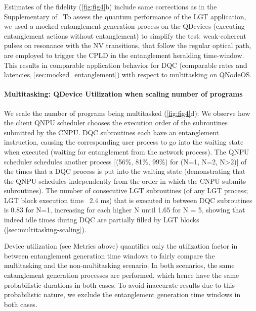 Estimates of the fidelity (\cref{fig:fig4}b) include same corrections as in the Supplementary of~\cite{pompili_2021_multinode} To assess the quantum performance of the LGT application, we used a mocked entanglement generation process on the QDevices (executing entanglement actions without entanglement) to simplify the test: weak-coherent pulses on resonance with the NV transitions, that follow the regular optical path, are employed to trigger the CPLD in the entanglement heralding time-window. This results in comparable application behavior for DQC (comparable rates and latencies, \cref{sec:mocked_entanglement}) with respect to multitasking on QNodeOS.

\paragraph{Multitasking: QDevice Utilization when scaling number of programs}

We scale the number of programs being multitasked (\cref{fig:fig4}d): We observe how the client QNPU scheduler chooses the execution order of the subroutines submitted by the CNPU. DQC subroutines each have an entanglement instruction, causing the corresponding user process to go into the waiting state when executed (waiting for entanglement from the network process). The QNPU scheduler schedules another process [(56\%, 81\%, 99\%) for (N=1, N=2, N>2)] of the times that a DQC process is put into the waiting state (demonstrating that the QNPU schedules independently from the order in which the CNPU submits subroutines). The number of consecutive LGT subroutines (of any LGT process; LGT block execution time ~2.4 ms) that is executed in between DQC subroutines is 0.83 for N=1, increasing for each higher N until 1.65 for N = 5, showing that indeed idle times during DQC are partially filled by LGT blocks (\cref{sec:multitasking-scaling}).

Device utilization (see Metrics above) quantifies only the utilization factor in between entanglement generation time windows to fairly compare the multitasking and the non-multitasking scenario. In both scenarios, the same entanglement generation processes are performed, which hence have the same probabilistic durations in both cases. To avoid inaccurate results due to this probabilistic nature, we exclude the entanglement generation time windows in both cases.